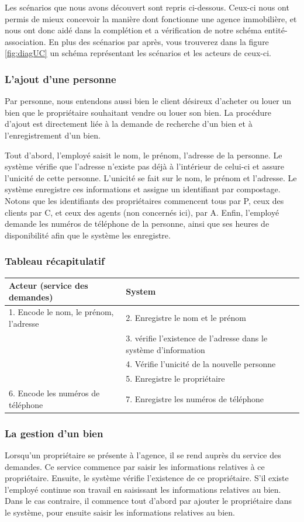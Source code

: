 Les scénarios que nous avons découvert sont repris ci-dessous. Ceux-ci nous ont permis de mieux concevoir la manière dont fonctionne une agence immobilière, et nous ont donc aidé dans la complétion et a vérification de notre schéma entité-association. En plus des scénarios par après, vous trouverez dans la figure \ref{fig:diagUC} un schéma représentant les scénarios et les acteurs de ceux-ci.

\subsubsection{L'ajout d'une personne}
Par personne, nous entendons aussi bien le client désireux d'acheter ou louer un bien que le propriétaire souhaitant vendre ou louer son bien.
La procédure d'ajout est directement liée à la demande de recherche d'un bien et à l'enregistrement d'un bien.

Tout d'abord, l'employé saisit le nom, le prénom, l'adresse de la personne.
Le système vérifie que l'adresse n'existe pas déjà à l'intérieur de celui-ci et assure l'unicité de cette personne. L'unicité se fait sur le nom, le prénom et l'adresse.
Le système enregistre ces informations et assigne un identifiant par compostage. Notons que les identifiants des propriétaires commencent tous par P, ceux des clients par C, et ceux des agents (non concernés ici), par A.
Enfin, l'employé demande les numéros de téléphone de la personne, ainsi que ses heures de disponibilité afin que le système les enregistre.

\subsubsection*{Tableau récapitulatif}
\begin{longtable}{|p{7.5cm}|p{7.5cm}|}
\hline
Acteur (service des demandes) & System\\
\hline
1. Encode le nom, le prénom, l'adresse & 2. Enregistre le nom et le prénom\\
& 3. vérifie l'existence de l'adresse dans le système d'information\\
& 4. Vérifie l'unicité de la nouvelle personne\\
& 5. Enregistre le propriétaire\\
6. Encode les numéros de téléphone  & 7. Enregistre les numéros de téléphone\\
\hline
\end{longtable}
\subsubsection{La gestion d'un bien}
Lorsqu'un propriétaire se présente à l'agence, il se rend auprès du service des demandes.
Ce service commence par saisir les informations relatives à ce propriétaire.
Ensuite, le système vérifie l'existence de ce propriétaire. S'il existe l'employé continue son travail en saisissant les informations relatives au bien. Dans le cas contraire, il commence tout d'abord par ajouter le propriétaire dans le système, pour ensuite saisir les informations relatives au bien.

